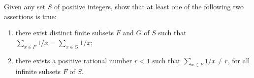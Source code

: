 Given any set $S$ of positive integers, show that at least one of the following two assertions is true:

\begin{enumerate}
	\item there exist distinct finite subsets $F$ and $G$ of $S$ such that $\sum_{x \in F} 1/x = \sum_{x \in G} 1/x$;

	\item there exists a positive rational number $r < 1$ such that $\sum_{x \in F} 1/x \neq r$, for all infinite subsets $F$ of $S$.
\end{enumerate}